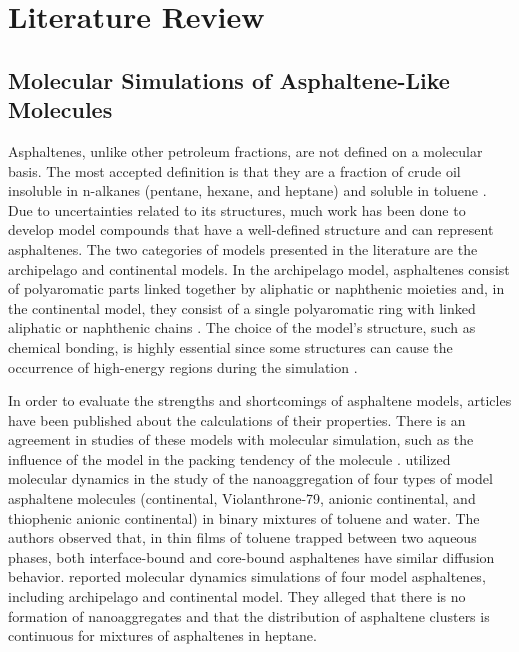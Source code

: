 
\chapter{Literature Review} %
\label{Chapter2} %
\section{Molecular Simulations of Asphaltene-Like Molecules}

Asphaltenes, unlike other petroleum fractions, are not defined on a molecular basis. The most accepted definition is that they are a fraction of crude oil insoluble in n-alkanes (pentane, hexane, and heptane) and soluble in toluene \cite{SJOBLOM2003399}. Due to uncertainties related to its structures, much work has been done to develop model compounds that have a well-defined structure and can represent asphaltenes. The two categories of models presented in the literature are the archipelago and continental models. In the archipelago model, asphaltenes consist of polyaromatic parts linked together by aliphatic or naphthenic moieties and, in the continental model, they consist of a single
polyaromatic ring with linked aliphatic or naphthenic chains \cite{doi:10.1021/ef900975e,doi:10.1080/0892702031000148762}. The choice of the model's structure, such as chemical bonding, is highly essential since some structures can cause the occurrence of high-energy regions during the simulation \cite{doi:10.1021/ef200507c} .   

In order to evaluate the strengths and shortcomings of asphaltene models, articles have been published about the calculations of their properties. There is an agreement in studies of these models with molecular simulation, such as the influence of the model in the packing tendency of the molecule \cite{doi:10.1080/10298436.2011.575141}.  utilized molecular dynamics in the study of the nanoaggregation of four types of model asphaltene molecules (continental, Violanthrone-79, anionic continental, and thiophenic anionic continental) in binary mixtures of toluene and water. The authors observed that, in thin films of toluene trapped between two aqueous phases, both interface-bound and core-bound asphaltenes have similar diffusion behavior.  reported molecular dynamics simulations of four model asphaltenes, including archipelago and continental model. They alleged that there is no formation of nanoaggregates and that the distribution of asphaltene clusters is continuous for mixtures of asphaltenes in heptane. 

